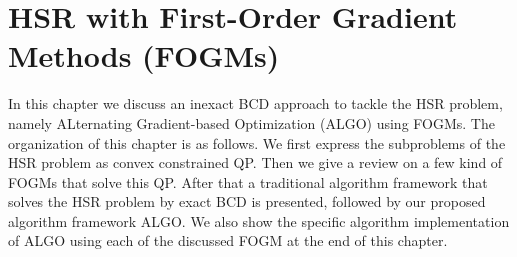 \chapter{HSR with First-Order Gradient Methods (FOGMs)}

In this chapter we discuss an inexact BCD approach to tackle the HSR problem,
namely ALternating Gradient-based Optimization (ALGO) using FOGMs.
The organization of this chapter is as follows.
We first express the subproblems of the HSR problem as convex constrained QP.
Then we give a review on a few kind of FOGMs that solve this QP.
After that a traditional algorithm framework that solves the HSR problem by
exact BCD is presented, followed by our proposed algorithm framework ALGO.
We also show the specific algorithm implementation of ALGO using each of the
discussed FOGM at the end of this chapter.


